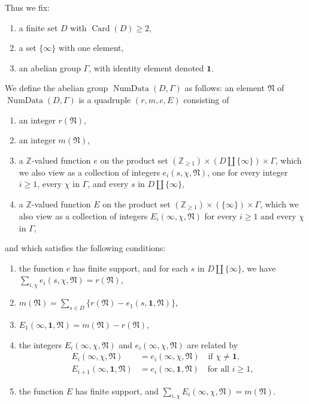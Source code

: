 Thus we fix:
\begin{enumerate}[label=(\roman*)]
\item a finite set \(D\) with \(\operatorname{Card}(D)\geq 2\),
\item a set \(\{\infty\}\) with one element,
\item an abelian group \(\Gamma\), with identity element denoted \(\mathbf{1}\).
\end{enumerate}
We define the abelian group \(\operatorname{NumData}(D,\Gamma)\) as follows: an element \(\mathfrak{N}\) of \(\operatorname{NumData}(D,\Gamma)\) is a quadruple \((r,m,e,E)\) consisting of
\begin{enumerate}[label=(\arabic*)]
\item an integer \(r(\mathfrak{N})\),
\item an integer \(m(\mathfrak{N})\),
\item a \(\mathbb{Z}\)-valued function \(e\) on the product set \((\mathbb{Z}_{\geq 1})\times(D\amalg\{\infty\})\times\Gamma\), which we also view as a collection of integers \(e_i(s,\chi,\mathfrak{N})\), one for every integer \(i\geq 1\), every \(\chi\) in \(\Gamma\), and every \(s\) in \(D\amalg\{\infty\}\),
\item a \(\mathbb{Z}\)-valued function \(E\) on the product set \((\mathbb{Z}_{\geq 1})\times(\{\infty\})\times\Gamma\), which we also view as a collection of integers \(E_i(\infty,\chi,\mathfrak{N})\) for every \(i\geq 1\) and every \(\chi\) in \(\Gamma\),
\end{enumerate}
and which satisfies the following conditions:
\begin{enumerate}[label=(\arabic*)]
\item the function \(e\) has finite support, and for each \(s\) in \(D\amalg\{\infty\}\), we have \(\sum_{i,\chi}e_i(s,\chi,\mathfrak{N})=r(\mathfrak{N})\),
\item \(m(\mathfrak{N})=\sum_{s\in D}\{r(\mathfrak{N})-e_1(s,\mathbf{1},\mathfrak{N})\}\),
\item \(E_1(\infty,\mathbf{1},\mathfrak{N})=m(\mathfrak{N})-r(\mathfrak{N})\),
\item the integers \(E_i(\infty,\chi,\mathfrak{N})\) and \(e_i(\infty,\chi,\mathfrak{N})\) are related by
\[
\begin{aligned}
E_i(\infty,\chi,\mathfrak{N})&=e_i(\infty,\chi,\mathfrak{N})\quad\text{if }\chi\ne\mathbf{1},\\
E_{i+1}(\infty,\mathbf{1},\mathfrak{N})&=e_i(\infty,\mathbf{1},\mathfrak{N})\quad\text{for all }i\geq 1,
\end{aligned}
\]
\item the function \(E\) has finite support, and \(\sum_{i,\chi}E_i(\infty,\chi,\mathfrak{N})=m(\mathfrak{N})\).
\end{enumerate}

